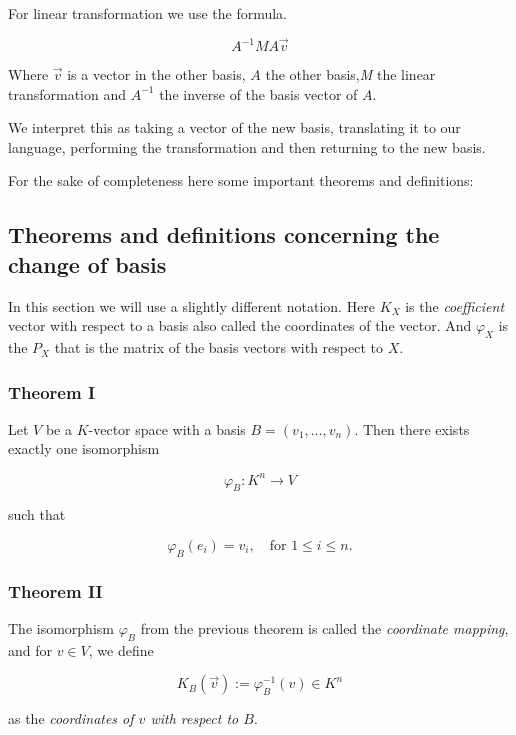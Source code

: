 For linear transformation we use the formula.

\[
    A^{-1} M A \vec{v}
\]

Where \(\vec{v}\) is a vector in the other basis, \(A\) the
other basis,\emph{M} the linear transformation and \(A^{-1}\) the inverse of
the basis vector of \(A\).
\vspace{\baselineskip}

We interpret this as taking a vector of the new basis, translating it to our language,
performing the transformation and then returning to the new basis.
\vspace{\baselineskip}

For the sake of completeness here some important theorems and definitions:

\subsection{Theorems and definitions concerning the change of basis}

In this section we will use a slightly different notation. Here \(K_X\) is 
the \emph{coefficient} vector with respect to a basis also called the coordinates
of the vector. And \(\varphi_X\) is the \(P_X\) that is the matrix of the basis vectors with
respect to \(X\).

\subsubsection{Theorem I} 

Let \( V \) be a \( K \)-vector space with a basis \( B = (v_1, \ldots, v_n) \).  
Then there exists exactly one isomorphism 

\[
    \varphi_B : K^n \to V
\]

such that

\[
    \varphi_B(e_i) = v_i, \quad \text{for } 1 \leq i \leq n.
\]

\subsubsection{Theorem II} 

The isomorphism \( \varphi_B \) from the previous theorem is called the \emph{coordinate mapping},  
and for \( v \in V \), we define

\[
    K_B (\vec{v}) := \varphi_B^{-1} (v) \in K^n
\]

as the \emph{coordinates of \( v \) with respect to \(B\)}.

